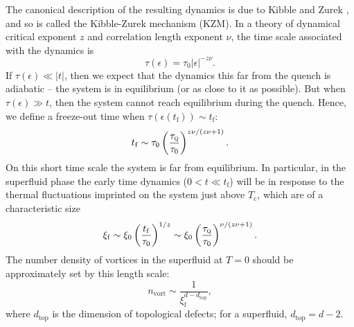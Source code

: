 \documentclass[10pt, oneside]{book}
\begin{document}
\begin{doublespace}
The canonical description of the resulting dynamics is due to Kibble \cite{Kibble:1980mv} and Zurek \cite{Zurek:1985qw}, and so is called the Kibble-Zurek mechanism (KZM).   In a theory of dynamical critical exponent $z$ and correlation length exponent $\nu$, the time scale associated with the dynamics is \begin{equation}
\tau(\epsilon) = \tau_0 |\epsilon|^{-z\nu}.
\end{equation}
If $\tau(\epsilon) \ll |t|$,  then we expect that the dynamics this far from the quench is adiabatic -- the system is in equilibrium (or as close to it as possible).   But when $\tau(\epsilon) \gg t$, then the system cannot reach equilibrium during the quench.   Hence, we define a freeze-out time when $\tau(\epsilon(t_{\mathrm{f}}))\sim t_{\mathrm{f}}$: \begin{equation}
t_{\mathrm{f}} \sim \tau_0 \left(\frac{\tau_{\textsc{q}}}{\tau_0}\right)^{z\nu/(z\nu+1)}.
\end{equation}
On this short time scale the system is far from equilibrium.   In particular, in the superfluid phase the early time dynamics ($0< t\ll t_{\mathrm{f}}$) will be in response to the thermal fluctuations imprinted on the system just above $T_{\mathrm{c}}$, which are of a characteristic size \begin{equation}
\xi_{\mathrm{f}} \sim \xi_0 \left(\frac{t_{\mathrm{f}}}{\tau_0}\right)^{1/z} \sim \xi_0 \left(\frac{\tau_{\textsc{q}}}{\tau_0}\right)^{\nu/(z\nu+1)}.
\end{equation}
The number density of vortices  in the superfluid at $T=0$ should be approximately set by this length scale: \begin{equation}
n_{\mathrm{vort}} \sim \frac{1}{\xi^{d-d_{\mathrm{top}}}_{\mathrm{f}}},   \label{eq:kzm}
\end{equation}
where $d_{\mathrm{top}}$ is the dimension of topological defects;  for a superfluid,  $d_{\mathrm{top}} = d-2$.   


\end{doublespace}
\end{document}
